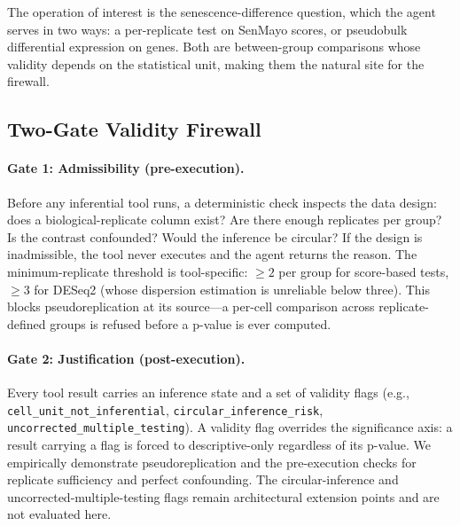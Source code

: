 \documentclass[pmlr,twocolumn,10pt]{jmlr}
\begin{document}
The operation of interest is the senescence-difference question, which the agent
serves in two ways: a per-replicate test on SenMayo scores, or pseudobulk
differential expression on genes. Both are between-group comparisons whose
validity depends on the statistical unit, making them the natural site for the
firewall.

\subsection{Two-Gate Validity Firewall}

\paragraph{Gate 1: Admissibility (pre-execution).}
Before any inferential tool runs, a deterministic check inspects the data
design: does a biological-replicate column exist? Are there enough replicates
per group? Is the contrast confounded? Would the inference be circular? If the
design is inadmissible, the tool never executes and the agent returns the reason.
The minimum-replicate threshold is tool-specific: ${\geq}2$ per group for
score-based tests, ${\geq}3$ for DESeq2 (whose dispersion estimation is
unreliable below three). This blocks pseudoreplication at its source---a per-cell
comparison across replicate-defined groups is refused before a p-value is ever
computed.

\paragraph{Gate 2: Justification (post-execution).}
Every tool result carries an inference state and a set of validity flags
(e.g., \texttt{cell\_unit\_not\_inferential},
\texttt{circular\_inference\_risk},
\texttt{uncorrected\_multiple\_testing}). A validity flag overrides the
significance axis: a result carrying a flag is forced to descriptive-only
regardless of its p-value. We empirically demonstrate pseudoreplication and the
pre-execution checks for replicate sufficiency and perfect confounding. The
circular-inference and uncorrected-multiple-testing flags remain architectural
extension points and are not evaluated here.
\end{document}
